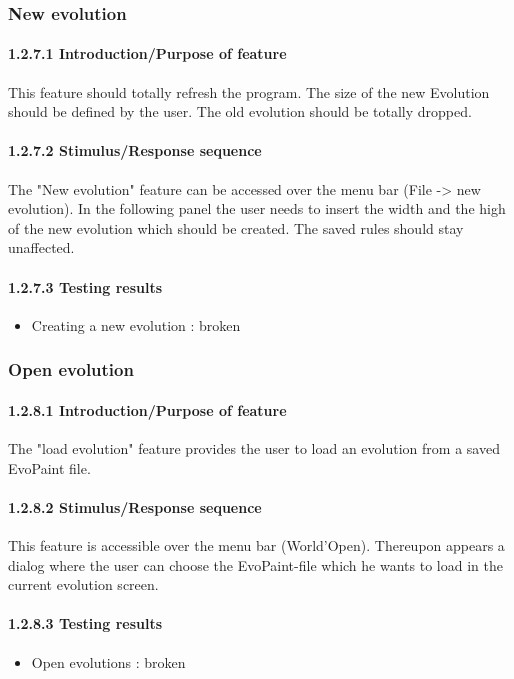 \documentclass[titlepage,12pt]{scrartcl}
\begin{document}
\subsubsection{New evolution}
\paragraph{1.2.7.1 Introduction/Purpose of feature}
This feature should totally refresh the program. The size of the new Evolution should be defined by the user. The old evolution should be totally dropped.
\paragraph{1.2.7.2 Stimulus/Response sequence}
The "New evolution" feature can be accessed over the menu bar (File -> new evolution). In the following panel the user needs to insert the width and the high of the new evolution which should be created. The saved rules should stay unaffected.
\paragraph{1.2.7.3 Testing results}
\begin{itemize}
	\item Creating a new evolution 	: broken
\end{itemize}

\subsubsection{Open evolution}
\paragraph{1.2.8.1 Introduction/Purpose of feature}
The "load evolution" feature provides the user to load an evolution from a saved EvoPaint file.
\paragraph{1.2.8.2 Stimulus/Response sequence}
This feature is accessible over the menu bar (World'Open). Thereupon appears a dialog where the user can choose the EvoPaint-file which he wants to load in the current evolution screen.
\paragraph{1.2.8.3 Testing results}
\begin{itemize}
	\item Open evolutions 	: broken
\end{itemize}
\end{document}
